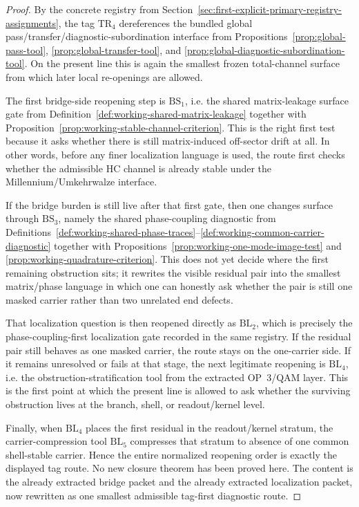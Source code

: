 \begin{proof}
By the concrete registry from Section~\ref{sec:first-explicit-primary-registry-assignments}, the tag \(\mathrm{TR}_4\) dereferences the bundled global pass/transfer/diagnostic-subordination interface from Propositions~\ref{prop:global-pass-tool}, \ref{prop:global-transfer-tool}, and \ref{prop:global-diagnostic-subordination-tool}. On the present line this is again the smallest frozen total-channel surface from which later local re-openings are allowed.

The first bridge-side reopening step is \(\mathrm{BS}_1\), i.e. the shared matrix-leakage surface gate from Definition~\ref{def:working-shared-matrix-leakage} together with Proposition~\ref{prop:working-stable-channel-criterion}. This is the right first test because it asks whether there is still matrix-induced off-sector drift at all. In other words, before any finer localization language is used, the route first checks whether the admissible HC channel is already stable under the Millennium/Umkehrwalze interface.

If the bridge burden is still live after that first gate, then one changes surface through \(\mathrm{BS}_3\), namely the shared phase-coupling diagnostic from Definitions~\ref{def:working-shared-phase-traces}--\ref{def:working-common-carrier-diagnostic} together with Propositions~\ref{prop:working-one-mode-image-test} and \ref{prop:working-quadrature-criterion}. This does not yet decide where the first remaining obstruction sits; it rewrites the visible residual pair into the smallest matrix/phase language in which one can honestly ask whether the pair is still one masked carrier rather than two unrelated end defects.

That localization question is then reopened directly as \(\mathrm{BL}_2\), which is precisely the phase-coupling-first localization gate recorded in the same registry. If the residual pair still behaves as one masked carrier, the route stays on the one-carrier side. If it remains unresolved or fails at that stage, the next legitimate reopening is \(\mathrm{BL}_4\), i.e. the obstruction-stratification tool from the extracted OP~3/QAM layer. This is the first point at which the present line is allowed to ask whether the surviving obstruction lives at the branch, shell, or readout/kernel level.

Finally, when \(\mathrm{BL}_4\) places the first residual in the readout/kernel stratum, the carrier-compression tool \(\mathrm{BL}_5\) compresses that stratum to absence of one common shell-stable carrier. Hence the entire normalized reopening order is exactly the displayed tag route. No new closure theorem has been proved here. The content is the already extracted bridge packet and the already extracted localization packet, now rewritten as one smallest admissible tag-first diagnostic route.
\end{proof}

